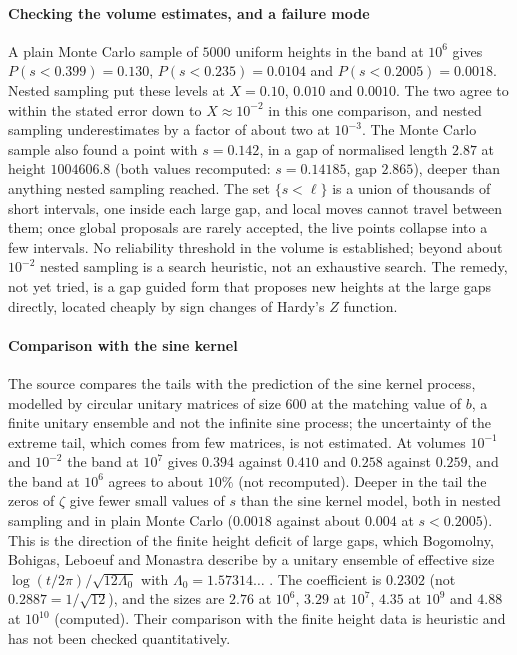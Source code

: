 \paragraph{Checking the volume estimates, and a failure mode} A plain Monte Carlo sample of $5000$ uniform heights in the band at $10^6$ gives $P(s<0.399)=0.130$, $P(s<0.235)=0.0104$ and $P(s<0.2005)=0.0018$. Nested sampling put these levels at $X=0.10$, $0.010$ and $0.0010$. The two agree to within the stated error down to $X\approx10^{-2}$ in this one comparison, and nested sampling underestimates by a factor of about two at $10^{-3}$. The Monte Carlo sample also found a point with $s=0.142$, in a gap of normalised length $2.87$ at height $1004606.8$ (both values recomputed: $s=0.14185$, gap $2.865$), deeper than anything nested sampling reached. The set $\{s<\ell\}$ is a union of thousands of short intervals, one inside each large gap, and local moves cannot travel between them; once global proposals are rarely accepted, the live points collapse into a few intervals. No reliability threshold in the volume is established; beyond about $10^{-2}$ nested sampling is a search heuristic, not an exhaustive search. The remedy, not yet tried, is a gap guided form that proposes new heights at the large gaps directly, located cheaply by sign changes of Hardy's $Z$ function.

\paragraph{Comparison with the sine kernel} The source compares the tails with the prediction of the sine kernel process, modelled by circular unitary matrices of size $600$ at the matching value of $b$, a finite unitary ensemble and not the infinite sine process; the uncertainty of the extreme tail, which comes from few matrices, is not estimated. At volumes $10^{-1}$ and $10^{-2}$ the band at $10^7$ gives $0.394$ against $0.410$ and $0.258$ against $0.259$, and the band at $10^6$ agrees to about $10\%$ (not recomputed). Deeper in the tail the zeros of $\zeta$ give fewer small values of $s$ than the sine kernel model, both in nested sampling and in plain Monte Carlo ($0.0018$ against about $0.004$ at $s<0.2005$). This is the direction of the finite height deficit of large gaps, which Bogomolny, Bohigas, Leboeuf and Monastra describe by a unitary ensemble of effective size $\log(t/2\pi)/\sqrt{12\Lambda_0}$ with $\Lambda_0=1.57314\ldots$ \cite{BBLM06}. The coefficient is $0.2302$ (not $0.2887=1/\sqrt{12}$), and the sizes are $2.76$ at $10^6$, $3.29$ at $10^7$, $4.35$ at $10^9$ and $4.88$ at $10^{10}$ (computed). Their comparison with the finite height data is heuristic and has not been checked quantitatively.

